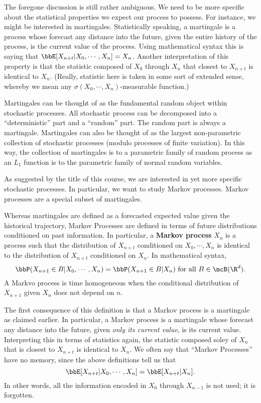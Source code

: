 \documentclass{report}
\begin{document}
The foregone discussion is still rather ambiguous.  We need to be more specific about the statistical properties we expect our process to possess.  For instance, we might be interested in martingales.  Statistically speaking, a martingale is a process whose forecast any distance into the future, given the entire history of the process, is the current value of the process.  Using mathematical syntax this is saying that $\bbE[X_{n+t} | X_0, \cdots, X_n ] = X_n$.  Another interpretation of this property is that the statistic composed of $X_0$ through $X_n$ that closest to $X_{n+t}$ is identical to $X_n$.  (Really, statistic here is taken in some sort of extended sense, whereby we mean any $\sigma(X_0, \cdots, X_n)$-measurable function.) 

Martingales can be thought of as the fundamental random object within stochastic processes.  All stochastic process can be decomposed into a ``deterministic'' part and a ``random'' part.  The random part is always a martingale.  Martingales can also be thought of as the largest non-parametric collection of stochastic processes (modulo processes of finite variation).  In this way, the collection of martingales is to a parametric family of random process as an $L_1$ function is to the parametric family of normal random variables.

As suggested by the title of this course, we are interested in yet more specific stochastic processes.  In particular, we want to study Markov processes.  Markov processes are a special subset of martingales.  

Whereas martingales are defined as a forecasted expected value given the historical trajectory, Markov Processes are defined in terms of future distributions conditioned on past information.  In particular, a \textbf{Markov process}  $X_n$ is a process such that the distribution of $X_{n+t}$ conditioned on $X_0, \cdots, X_n$ is identical to the distribution of $X_{n+t}$ conditioned on $X_n$.  In mathematical syntax,
\[
\bbP(X_{n+1} \in B | X_0, \cdots, X_n) = \bbP(X_{n+1} \in B | X_n) \textmd{ for all } B \in \mcB(\R^d).
\]
A Markvo process is  time homogeneous when the conditional distribution of $X_{n+1}$ given $X_n$ does not depend on $n$.

The first consequence of this definition is that a Markov process is a martingale as claimed earlier.  In particular, a Markov process is a martingale whose forecast any distance into the future, given \emph{only its current value}, is its current value.  Interpreting this in terms of statistics again, the  statistic composed soley of $X_n$ that is closest to $X_{n+t}$ is identical to $X_n$.  We often say that ``Markov Processes'' have no memory, since the above definitions tell us that
\[
\bbE[X_{n+t} | X_0, \cdots, X_n] = \bbE[X_{n+t} | X_n ].
\]
In other words, all the information encoded in $X_0$ through $X_{n-1}$ is not used; it is forgotten.
\end{document}
